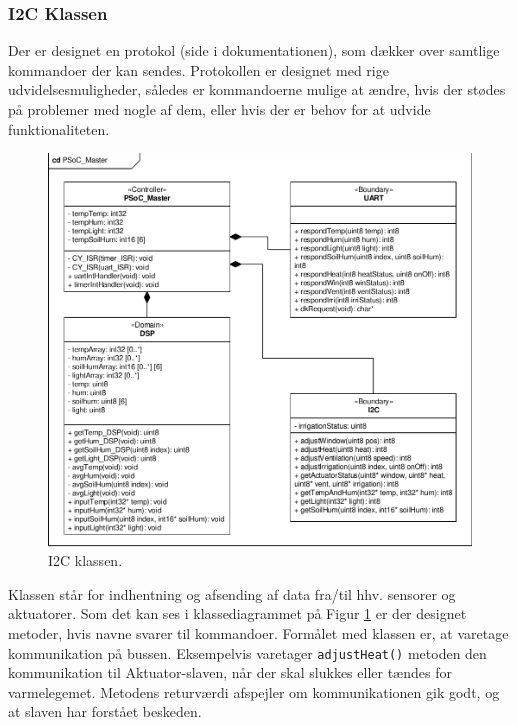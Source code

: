 \subsubsection{I2C Klassen}	\label{sec:I2C_design}

Der er designet en \IIC protokol (side \pageref{P-sec:I2C_protokol} i dokumentationen), som dækker over samtlige kommandoer der kan sendes.
Protokollen er designet med rige udvidelsesmuligheder, således er kommandoerne mulige at ændre, hvis der stødes på problemer med nogle af dem, eller hvis der er behov for at udvide funktionaliteten.

\begin{figure}[h]
\centering 
\includegraphics[width=\textwidth * 2/5, trim=269 27 17 267, clip=true] {../fig/cd_PSoC_master.pdf}
\caption{I2C klassen.}
\label{fig:i2C_klasse}
\end{figure}

Klassen \IIC står for indhentning og afsending af data fra/til hhv. sensorer og aktuatorer. Som det kan ses i klassediagrammet på Figur \ref{fig:i2C_klasse} er der designet metoder, hvis navne svarer til kommandoer. Formålet med klassen er, at varetage kommunikation på \IIC bussen. Eksempelvis varetager \texttt{adjustHeat()} metoden den kommunikation til Aktuator-slaven, når der skal slukkes eller tændes for varmelegemet. Metodens returværdi afspejler om kommunikationen gik godt, og at slaven har forstået beskeden.